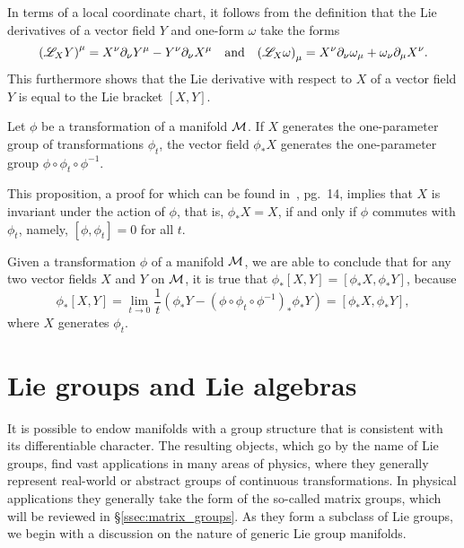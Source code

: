 \documentclass[
final,
11pt,
a4paper,
DIV=11,
headinclude=true,
footinclude=false,
bibliography=totoc,
twoside=true,  %
BCOR=5mm
]{scrbook}
\begin{document}
In terms of a local coordinate chart, it follows from the 
definition that the Lie derivatives of a vector field $Y$ and 
one-form $\omega$ take the forms
\begin{equation*}
  {(\mathscr{L}_X Y)}^\mu = X^\nu\partial_\nu Y^\mu - Y^\nu\partial_\nu 
  X^\mu
  \quad\text{and}\quad
  {(\mathscr{L}_X \omega)}_\mu = X^\nu\partial_\nu \omega_\mu 
  + \omega_\nu \partial_\mu X^\nu.
\end{equation*}
This furthermore shows that the Lie derivative with respect to 
$X$ of a vector field $Y$ is equal to the Lie bracket $[X,Y]$.

\begin{proposition}
\label{prop:transfGener}
Let $\phi$ be a transformation of a manifold $\mathcal{M}$. If $X$ 
generates the one-parameter group of transformations $\phi_t$, 
the vector field $\phi_* X$ generates the one-parameter group 
$\phi \circ \phi_t \circ \phi^{-1}$.
\end{proposition}

This proposition, a proof for which can be found 
in~\cite{kob1996found}, pg.~14, implies that $X$ is invariant 
under the action of $\phi$, that is, $\phi_* X = X$, if and only 
if $\phi$ commutes with $\phi_t$, namely, $[\phi,\phi_t] = 0$ for 
all $t$.

Given a transformation $\phi$ of a manifold $\mathcal{M}$, we are able 
to conclude that for any two vector fields $X$ and $Y$ on 
$\mathcal{M}$, it is true that $\phi_*[X,Y] = [\phi_*X,\phi_*Y]$, 
because
\begin{equation}
\label{eq:transfCommBrack}
\phi_*[X,Y] = \lim_{t \to 0} \frac{1}{t}(\phi_*Y - {(\phi \circ 
  \phi_t \circ \phi^{-1})}_* \phi_*Y) = [\phi_*X,\phi_*Y],
\end{equation}
where $X$ generates $\phi_t$.

\section{Lie groups and Lie algebras}
\label{sec:LieGrAlg}

It is possible to endow manifolds with a group structure that is 
consistent with its differentiable character.  The resulting 
objects, which go by the name of Lie groups, find vast 
applications in many areas of physics, where they generally 
represent real-world or abstract groups of continuous 
transformations. In physical applications they generally take the 
form of the so-called matrix groups, which will be reviewed in 
\S\ref{ssec:matrix_groups}. As they form a subclass of Lie 
groups, we begin with a discussion on the nature of generic Lie 
group manifolds.
\end{document}
